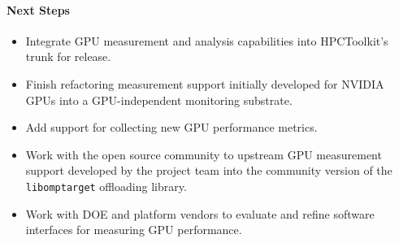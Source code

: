 \paragraph{Next Steps}
\begin{itemize}

\item 
Integrate GPU measurement and analysis capabilities into HPCToolkit's trunk for
release.

\item 
Finish refactoring measurement support initially developed for NVIDIA GPUs into a GPU-independent monitoring substrate.

\item 
Add support for collecting new GPU performance metrics.

\item 
Work with the open source community to upstream GPU measurement support
developed by the project team into the community version of the {\tt
libomptarget} offloading library.

\item 
Work with DOE and platform vendors to evaluate and refine software interfaces for measuring GPU performance.

\end{itemize}
